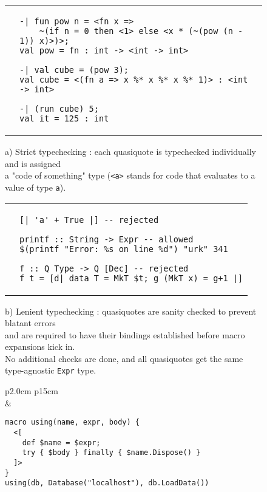 \documentclass[10pt,journal,a4paper]{IEEEtran}
\begin{document}
\begin{figure*}[t]
\begin{listing}
\normalsize

\begin{tabular}{p{2.0cm} p{15cm}}\\
 &
\begin{verbatim}
-| fun pow n = <fn x =>
    ~(if n = 0 then <1> else <x * (~(pow (n - 1)) x)>)>;
val pow = fn : int -> <int -> int>

-| val cube = (pow 3);
val cube = <(fn a => x %* x %* x %* 1)> : <int -> int>

-| (run cube) 5;
val it = 125 : int
\end{verbatim}
\end{tabular}

\begin{adjustwidth}{2.5cm}{0pt}
a) Strict typechecking \cite{taha99}: each quasiquote is typechecked individually and is assigned\\
a "code of something" type (\texttt{<a>} stands for code that evaluates to a value of type \texttt{a}).\\
\end{adjustwidth}

\begin{tabular}{p{2.0cm} p{15cm}}\\
 &
\begin{verbatim}
[| 'a' + True |] -- rejected

printf :: String -> Expr -- allowed
$(printf "Error: %s on line %d") "urk" 341

f :: Q Type -> Q [Dec] -- rejected
f t = [d| data T = MkT $t; g (MkT x) = g+1 |]
\end{verbatim}
\end{tabular}

\begin{adjustwidth}{2.5cm}{0pt}
b) Lenient typechecking \cite{sheard02}: quasiquotes are sanity checked to prevent blatant errors\\
and are required to have their bindings established before macro expansions kick in.\\
No additional checks are done, and all quasiquotes get the same type-agnostic \texttt{Expr} type.
\end{adjustwidth}

\begin{tabular}{p{2.0cm} p{15cm}}\\
 &
\begin{verbatim}
macro using(name, expr, body) {
  <[
    def $name = $expr;
    try { $body } finally { $name.Dispose() }
  ]>
}
using(db, Database("localhost"), db.LoadData())
\end{verbatim}
\end{tabular}


\end{listing}
\end{figure*}
\end{document}
